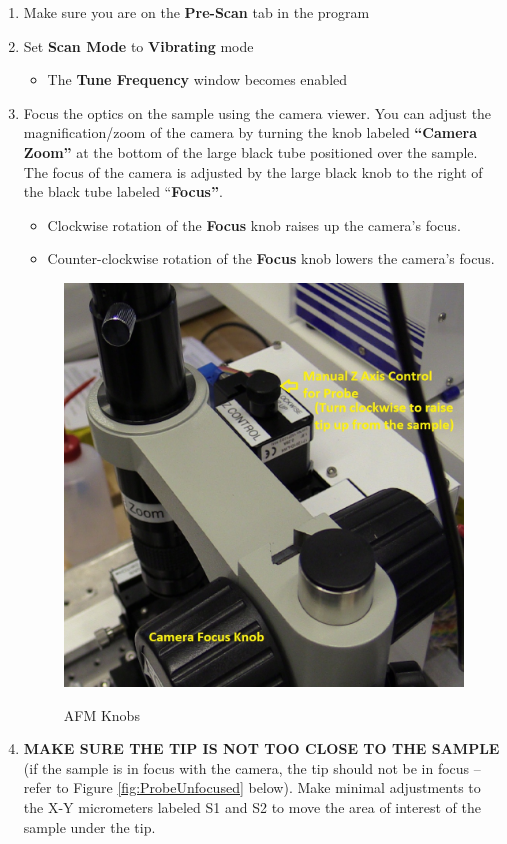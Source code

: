 \documentclass{../lab}
\begin{document}
\begin{enumerate}
    \item Make sure you are on the \textbf{Pre-Scan} tab in the program
    
    \item Set \textbf{Scan Mode} to \textbf{Vibrating} mode
    \begin{itemize}
        \item The \textbf{Tune Frequency} window becomes enabled
    \end{itemize}

    \item Focus the optics on the sample using the camera viewer.  You can adjust the magnification/zoom of the camera by turning the knob labeled\textbf{ ``Camera Zoom''} at the bottom of the large black tube positioned over the sample.  The focus of the camera is adjusted by the large black knob to the right of the black tube labeled ``\textbf{Focus''}.
    \begin{itemize}
        \item Clockwise rotation of the \textbf{Focus} knob raises up the camera's focus.
        \item Counter-clockwise rotation of the \textbf{Focus} knob lowers the camera's focus.
    \end{itemize}

    \begin{figure}[H]
        \centering
        \href{http://experimentationlab.berkeley.edu/sites/default/files/AFMImages/ZControl.jpg}{\includegraphics[width=0.6\linewidth]{images/ZControl.jpg}}
        \caption{AFM Knobs}
    \end{figure}
    
    \item\textbf{MAKE SURE THE TIP IS NOT TOO CLOSE TO THE SAMPLE} (if the sample is in focus with the camera, the tip should not be in focus -- refer to Figure \ref{fig:ProbeUnfocused} below). Make minimal adjustments to the X-Y micrometers labeled S1 and S2 to move the area of interest of the sample under the tip.
    
\end{enumerate}
\end{document}
